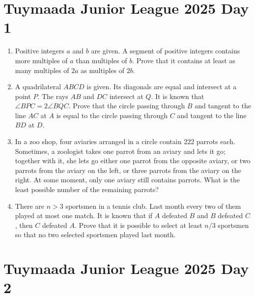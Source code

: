 \documentclass[12pt]{scrartcl}
\begin{document}
\renewcommand*\contentsname{Daftar Isi}
\tableofcontents

\newpage

\section{Tuymaada Junior League 2025 Day 1}
\begin{enumerate}[resume]
    \item Positive integers $a$ and $b$ are given. A segment of positive integers contains more multiples of $a$ than multiples of $b$. Prove that it contains at least as many multiples of $2a$ as multiples of $2b$. 

    \item A quadrilateral $ABCD$ is given. Its diagonals are equal and intersect at a point $P$. The rays $AB$ and $DC$ intersect at $Q$. It is known that $\angle BPC = 2\angle BQC$. Prove that the circle passing through $B$ and tangent to the line $AC$ at $A$ is equal to the circle passing through $C$ and tangent to the line $BD$ at $D$. 

    \item In a zoo shop, four aviaries arranged in a circle contain 222 parrots each. Sometimes, a zoologist takes one parrot from an aviary and lets it go; together with it, she lets go either one parrot from the opposite aviary, or two parrots from the aviary on the left, or three parrots from the aviary on the right. At some moment, only one aviary still contains parrots. What is the least possible number of the remaining parrots? 

    \item There are $n > 3$ sportsmen in a tennis club. Last month every two of them played at most one match. It is known that if $A$ defeated $B$ and $B$ defeated $C$, then $C$ defeated $A$. Prove that it is possible to select at least $n/3$ sportsmen so that no two selected sportsmen played last month. 
\end{enumerate}

\section{Tuymaada Junior League 2025 Day 2}
\end{document}
